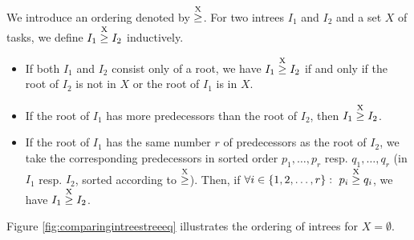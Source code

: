 \begin{definition}
  We introduce an ordering denoted by $\stackrel{\text{X}}{\geq}$. For two intrees $I_1$ and $I_2$ and a set $X$ of tasks, we define $I_1 \stackrel{\text{X}}{\geq} I_2$ inductively. 
  \begin{itemize}
  \item If both $I_1$ and $I_2$ consist only of a root, we have $I_1 \stackrel{\text{X}}{\geq} I_2$ if and only if the root of $I_2$ is not in $X$ or the root of $I_1$ is in $X$.
  \item If the root of $I_1$ has more predecessors than the root of $I_2$, then $I_1 \stackrel{\text{X}}{\geq} I_2$.
  \item If the root of $I_1$ has the same number $r$ of predecessors as the root of $I_2$, we take the corresponding predecessors in sorted order $p_1,\dots,p_r$ resp. $q_1,\dots,q_r$ (in $I_1$ resp. $I_2$, sorted according to $\stackrel{\text{X}}{\geq}$). Then, if $\forall i\in\{1,2,\dots,r \}:\ p_i \stackrel{\text{X}}{\geq} q_i$, we have $I_1 \stackrel{\text{X}}{\geq} I_2$.
  \end{itemize}
\end{definition}

Figure \ref{fig:comparingintreestreeeq} illustrates the ordering of intrees for $X=\emptyset$.

